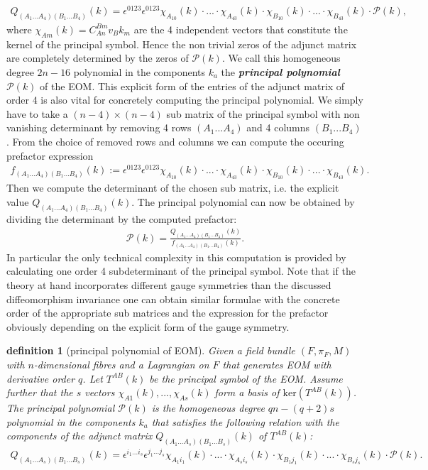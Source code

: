 \documentclass[a4paper,12pt, DIV=14, BCOR=5mm, twoside, headsepline]{scrbook}
\newtheorem{definition}{definition}[section]
\begin{document}
\begin{align}\label{diffeoMinor}
    Q_{(A_1...A_4) (B_1...B_4)}(k) = \epsilon^{0123} \epsilon^{0123} \chi_{A_10}(k) \cdot ... \cdot \chi_{A_43}(k) \cdot \chi_{B_10}(k) \cdot ... \cdot \chi_{B_43}(k) \cdot \mathcal{P}(k),
\end{align}
% 
%
%
%
where $\chi_{Am}(k) = C^{Bm}_{An} v_B k_m$ are the 4 independent vectors that constitute the kernel of the principal symbol. Hence the non trivial zeros of the adjunct matrix are completely determined by the zeros of $\mathcal{P}(k)$. We call this homogeneous degree $2n-16$ polynomial in the components $k_a$ the \textit{\textbf{principal polynomial}}  $\mathcal{P}(k)$ of the EOM.
This explicit form of the entries of the adjunct matrix of order 4 is also vital for concretely computing the principal polynomial. We simply have to take a $(n-4) \times (n-4)$ sub matrix of the principal symbol with non vanishing determinant by removing 4 rows $(A_1...A_4)$ and 4 columns $(B_1...B_4)$. From the choice of removed rows and columns we can compute the occuring prefactor expression 
\begin{align}\label{prefacF}
f_{(A_1...A_4)(B_1...B_4)}(k) := \epsilon^{0123} \epsilon^{0123} \chi_{A_10}(k) \cdot ... \cdot \chi_{A_43}(k) \cdot \chi_{B_10}(k) \cdot ... \cdot \chi_{B_43}(k).
\end{align}
Then we compute the determinant of the chosen sub matrix, i.e. the explicit value $Q_{(A_1...A_4)(B_1...B_4)}(k)$. The principal polynomial can now be obtained by dividing the determinant by the computed prefactor:
\begin{align}
    \mathcal{P}(k) = \frac{Q_{(A_1...A_4)(B_1...B_4)}(k)}{f_{(A_1...A_4)(B_1...B_4)}(k)}.
\end{align}
In particular the only technical complexity in this computation is provided by calculating one order 4 subdeterminant of the principal symbol. 
Note that if the theory at hand incorporates different gauge symmetries than the discussed diffeomorphism invariance one can obtain similar formulae with the concrete order of the appropriate sub matrices and the expression for the prefactor obviously depending on the explicit form of the gauge symmetry.
\begin{definition}[principal polynomial of EOM]
Given a field bundle $(F,\pi_F,M)$ with $n$-dimensional fibres and a Lagrangian on $F$ that generates EOM with derivative order $q$. Let  $T^{AB}(k)$ be the principal symbol of the EOM. Assume further that the $s$ vectors $\chi_{A1}(k),...,\chi_{As}(k)$ form a basis of $\mathrm{ker}(T^{AB}(k))$. The principal polynomial $\mathcal{P}(k)$
is the homogeneous degree $qn - (q+2)s$ polynomial in the components $k_a$ that satisfies the following relation with the components of the adjunct matrix $Q_{(A_1...A_s)(B_1...B_s)}(k)$ of $T^{AB}(k)$:
\begin{align}
   Q_{(A_1...A_s)(B_1...B_s)}(k) = \epsilon^{i_1...i_s} \epsilon^{j_1...j_s} \chi_{A_1i_1}(k)\cdot ... \cdot \chi_{A_si_s}(k) \cdot \chi_{B_1j_1}(k) \cdot ... \cdot \chi_{B_sj_s}(k) \cdot \mathcal{P}(k).
\end{align}
\end{definition}
\end{document}
